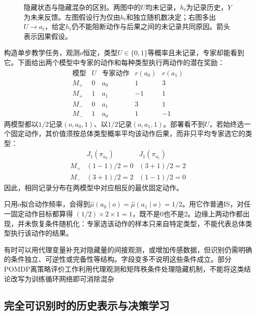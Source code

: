 \begin{figure}[htbp]
  \centering
  
  \caption{隐藏状态与隐藏混杂的区别。两图中的$U$均未记录，$h_t$为记录历史，$Y$为未来反馈。左图假设行为仅由$h_t$和独立随机数决定；右图多出$U\to a_t$，给定$h_t$仍不能阻断动作与后果之间的未记录共同原因。箭头表示因果假设。}
  \label{fig:rl-information-confounding}
\end{figure}

\begin{example}[同样日志与相反的动作价值]
  \label{ex:rl-information-confounding}
  构造单步教学任务，观测$o$恒定，类型$U\in\{0,1\}$等概率且未记录，专家却能看到它。下面给出两个模型中专家的动作和每种类型执行两动作的潜在奖励：
  \[
  \begin{array}{cc|c|rr}
    \text{模型}&U&\text{专家动作}&r(a_0)&r(a_1)\\
    \hline
    M_+&0&a_0&1&3\\
    M_+&1&a_1&-1&1\\
    M_-&0&a_1&3&1\\
    M_-&1&a_0&1&-1
  \end{array}
  \]
  两模型都以$1/2$记录$(o,a_0,1)$、以$1/2$记录$(o,a_1,1)$。部署看不到$U$，若始终选一个固定动作，其价值须按总体类型概率平均该动作后果，而非只平均专家选它的类型：
  \[
  \begin{array}{c|rr}
    &J_1(\pi_{a_0})&J_1(\pi_{a_1})\\
    \hline
    M_+&(1-1)/2=0&(3+1)/2=2\\
    M_-&(3+1)/2=2&(1-1)/2=0
  \end{array}
  \]
  因此，相同记录分布在两模型中对应相反的最优固定动作。
\end{example}

只用$o$拟合动作频率，会得到$\widehat\mu(a_0\mid o)=\widehat\mu(a_1\mid o)=1/2$。用它作普通IS，对任一固定动作目标都算得
$(1/2)\times2\times1=1$，既不是0也不是2。边缘上两动作都出现，并未恢复条件随机化：专家选该动作的样本只来自特定类型，不能代表总体类型执行该动作的结果。

有时可以用代理变量补充对隐藏量的间接观测，或增加传感数据，但识别仍需明确的条件独立、可逆性或完备性等结构。字段变多不说明这些条件成立。部分POMDP离策略评价工作利用代理观测和矩阵秩条件处理隐藏机制，不能将这类结论改写为训练循环网络即可消除混杂

\subsection{完全可识别时的历史表示与决策学习}
\label{sec:rl-information-full-identification}

